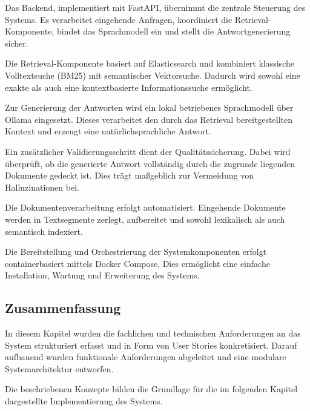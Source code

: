 Das Backend, implementiert mit FastAPI, übernimmt die zentrale Steuerung des Systems. Es verarbeitet eingehende Anfragen, koordiniert die Retrieval-Komponente, bindet das Sprachmodell ein und stellt die Antwortgenerierung sicher.

Die Retrieval-Komponente basiert auf Elasticsearch und kombiniert klassische Volltextsuche (BM25) mit semantischer Vektorsuche. Dadurch wird sowohl eine exakte als auch eine kontextbasierte Informationssuche ermöglicht.

Zur Generierung der Antworten wird ein lokal betriebenes Sprachmodell über Ollama eingesetzt. Dieses verarbeitet den durch das Retrieval bereitgestellten Kontext und erzeugt eine natürlichsprachliche Antwort.

Ein zusätzlicher Validierungsschritt dient der Qualitätssicherung. Dabei wird überprüft, ob die generierte Antwort vollständig durch die zugrunde liegenden Dokumente gedeckt ist. Dies trägt maßgeblich zur Vermeidung von Halluzinationen bei.

Die Dokumentenverarbeitung erfolgt automatisiert. Eingehende Dokumente werden in Textsegmente zerlegt, aufbereitet und sowohl lexikalisch als auch semantisch indexiert.

Die Bereitstellung und Orchestrierung der Systemkomponenten erfolgt containerbasiert mittels Docker Compose. Dies ermöglicht eine einfache Installation, Wartung und Erweiterung des Systems.

\subsection{Zusammenfassung}

In diesem Kapitel wurden die fachlichen und technischen Anforderungen an das System strukturiert erfasst und in Form von User Stories konkretisiert. Darauf aufbauend wurden funktionale Anforderungen abgeleitet und eine modulare Systemarchitektur entworfen.

Die beschriebenen Konzepte bilden die Grundlage für die im folgenden Kapitel dargestellte Implementierung des Systems.
\clearpage